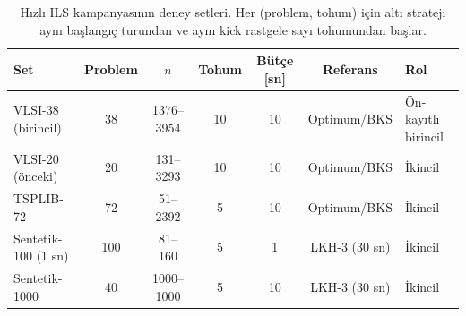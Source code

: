\begin{table}[!htbp]
\centering\small\setlength{\tabcolsep}{3pt}
\caption{Hızlı ILS kampanyasının deney setleri. Her (problem, tohum) için altı strateji aynı başlangıç turundan ve aynı kick rastgele sayı tohumundan başlar.}
\label{tab:v2-sets}
\begin{tabularx}{\textwidth}{@{}>{\raggedright\arraybackslash}Xcccccl@{}}
\toprule
Set & Problem & $n$ & Tohum & Bütçe [sn] & Referans & Rol \\
\midrule
VLSI-38 (birincil) & 38 & 1376--3954 & 10 & 10 & Optimum/BKS & Ön-kayıtlı birincil \\
VLSI-20 (önceki) & 20 & 131--3293 & 10 & 10 & Optimum/BKS & İkincil \\
TSPLIB-72 & 72 & 51--2392 & 5 & 10 & Optimum/BKS & İkincil \\
Sentetik-100 (1 sn) & 100 & 81--160 & 5 & 1 & LKH-3 (30 sn) & İkincil \\
Sentetik-1000 & 40 & 1000--1000 & 5 & 10 & LKH-3 (30 sn) & İkincil \\
\bottomrule
\end{tabularx}
\end{table}
